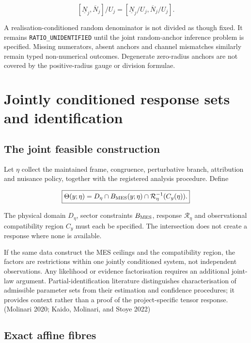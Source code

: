 \documentclass[
  11pt,
  a4paper]{article}
\begin{document}
\[
[\underline N_j,\overline N_j]/U_j
=[\underline N_j/U_j,\overline N_j/U_j].
\]

A realisation-conditioned random denominator is not divided as though fixed. It remains \mbox{\texttt{RATIO\_UNIDENTIFIED}} until the joint random-anchor inference problem is specified. Missing numerators, absent anchors and channel mismatches similarly remain typed non-numerical outcomes. Degenerate zero-radius anchors are not covered by the positive-radius gauge or division formulae.

\hypertarget{jointly-conditioned-response-sets-and-identification}{%
\section{Jointly conditioned response sets and identification}\label{jointly-conditioned-response-sets-and-identification}}

\hypertarget{the-joint-feasible-construction}{%
\subsection{The joint feasible construction}\label{the-joint-feasible-construction}}

Let \(\eta\) collect the maintained frame, congruence, perturbative branch, attribution and nuisance policy, together with the registered analysis procedure. Define

\[
\boxed{
\Theta(y;\eta)
=D_\eta\cap B_{\rm MES}(y;\eta)
\cap\mathcal R_\eta^{-1}(C_y(\eta)).
}
\]

The physical domain \(D_\eta\), sector constraints \(B_{\rm MES}\), response \(\mathcal R_\eta\) and observational compatibility region \(C_y\) must each be specified. The intersection does not create a response where none is available.

If the same data construct the MES ceilings and the compatibility region, the factors are restrictions within one jointly conditioned system, not independent observations. Any likelihood or evidence factorisation requires an additional joint-law argument. Partial-identification literature distinguishes characterisation of admissible parameter sets from their estimation and confidence procedures; it provides context rather than a proof of the project-specific tensor response. (Molinari 2020; Kaido, Molinari, and Stoye 2022)

\hypertarget{exact-affine-fibres}{%
\subsection{Exact affine fibres}\label{exact-affine-fibres}}
\end{document}
